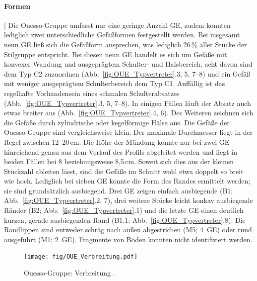 \paragraph{Formen}\hspace{-.5em}|\hspace{.5em}%
Die Ouesso-Gruppe umfasst nur eine geringe Anzahl GE, zudem konnten lediglich zwei unterschiedliche Gefäßformen festgestellt werden. Bei insgesamt neun GE ließ sich die Gefäßform ansprechen, was lediglich 26\,\% aller Stücke der Stilgruppe entspricht. Bei diesen neun GE handelt es sich um Gefäße mit konvexer Wandung und ausgeprägtem Schulter- und Halsbereich, acht davon sind dem Typ C2 zuzuordnen (Abb.~\ref{fig:OUE_Typvertreter}.3, 5, 7--8) und ein Gefäß mit weniger ausgeprägtem Schulterbereich dem Typ C1. Auffällig ist das regelhafte Vorhandensein eines schmalen Schulterabsatzes (Abb.~\ref{fig:OUE_Typvertreter}.3, 5, 7--8). In einigen Fällen läuft der Absatz auch etwas breiter aus (Abb.~\ref{fig:OUE_Typvertreter}.4, 6). Des Weiteren zeichnen sich die Gefäße durch zylindrische oder kegelförmige Hälse aus. Die Gefäße der Ouesso-Gruppe sind vergleichsweise klein. Der maximale Durchmesser liegt in der Regel zwischen 12--20\,cm. Die Höhe der Mündung konnte nur bei zwei GE hinreichend genau aus dem Verlauf des Profils abgeleitet werden und liegt in beiden Fällen bei 8 beziehungsweise 8,5\,cm. Soweit sich dies aus der kleinen Stückzahl ableiten lässt, sind die Gefäße im Schnitt wohl etwa doppelt so breit wie hoch. Lediglich bei sieben GE konnte die Form des Randes ermittelt werden; sie sind grundsätzlich ausbiegend. Drei GE zeigen einfach ausbiegende (B1; Abb.~\ref{fig:OUE_Typvertreter}.2, 7), drei weitere Stücke leicht konkav ausbiegende Ränder (B2; Abb.~\ref{fig:OUE_Typvertreter}.1) und die letzte GE einen deutlich kurzen, gerade ausbiegenden Rand (B1.1; Abb.~\ref{fig:OUE_Typvertreter}.8). Die Randlippen sind entweder schräg nach außen abgestrichen (M5; 4~GE) oder rund ausgeführt (M1; 2~GE). Fragmente von Böden konnten nicht identifiziert werden.

\begin{figure}[p]
	\centering
	\texttt{[image: fig/OUE\_Verbreitung.pdf]}
	\caption{Ouesso-Gruppe: Verbreitung \parencite[P1 nach][114 Abb.~42]{Gillet.2013}.}
	\label{fig:OUE_Verbreitung}
\end{figure}

